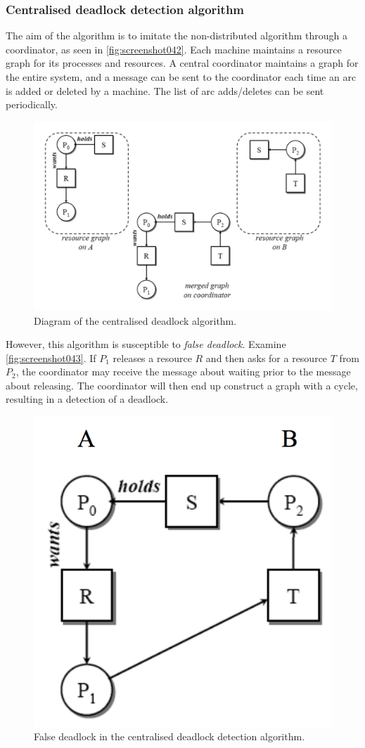\subsubsection{Centralised deadlock detection algorithm}
The aim of the algorithm is to imitate the non-distributed algorithm through a coordinator, as seen in \autoref{fig:screenshot042}. Each machine maintains a resource graph for its processes and resources. A central coordinator maintains a graph for the entire system, and a message can be sent to the coordinator each time an arc is added or deleted by a machine. The list of arc adds/deletes can be sent periodically.

\begin{figure}
\centering
\includegraphics[width=0.7\linewidth]{figures/screenshot042}
\caption{Diagram of the centralised deadlock algorithm.}
\label{fig:screenshot042}
\end{figure}

However, this algorithm is susceptible to \textit{false deadlock}. Examine \autoref{fig:screenshot043}. If $P_1$ releases a resource $R$ and then asks for a resource $T$ from $P_2$, the coordinator may receive the message about waiting prior to the message about releasing. The coordinator will then end up construct a graph with a cycle, resulting in a detection of a deadlock.

\begin{figure}
\centering
\includegraphics[width=0.4\linewidth]{figures/screenshot043}
\caption{False deadlock in the centralised deadlock detection algorithm.}
\label{fig:screenshot043}
\end{figure}

